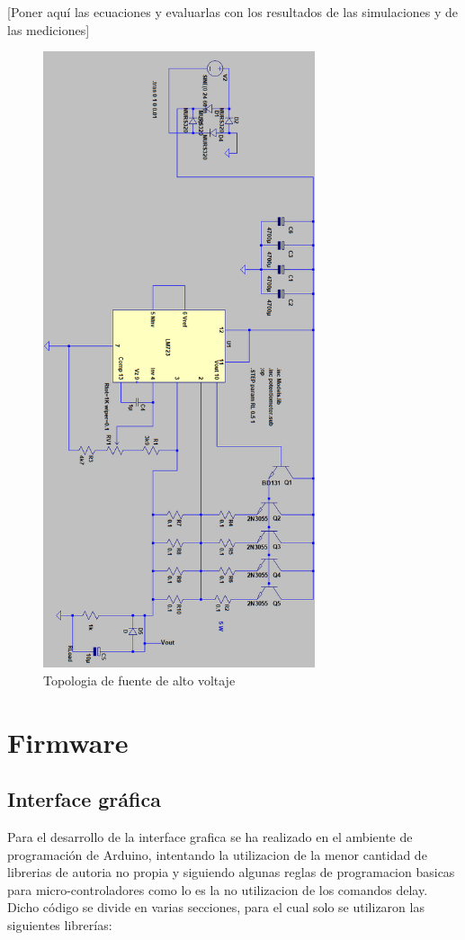 [Poner aquí las ecuaciones y evaluarlas con los resultados de las simulaciones y de las mediciones]

\begin{figure}[H]
\centering
\includegraphics[width=8cm]{Capitulo3/figs/sim.png}
\caption{Topologia de fuente de alto voltaje}
\end{figure}


\section{Firmware}
\subsection{Interface gráfica}
Para el desarrollo de la interface grafica se ha realizado en el ambiente de programación de Arduino, intentando la utilizacion de la menor cantidad de librerias de autoria no propia y siguiendo algunas reglas de programacion basicas para micro-controladores como lo es la no utilizacion de los comandos delay. Dicho código se divide en varias secciones, para el cual solo se utilizaron las siguientes librerías:


